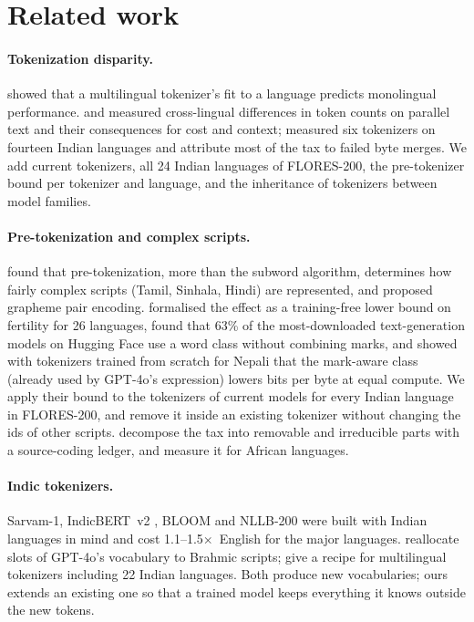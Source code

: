 \documentclass[11pt]{article}
\newcommand{\x}{$\times$}
\begin{document}
\section{Related work}

\paragraph{Tokenization disparity.} \citet{rust2021tokenizer} showed that a multilingual tokenizer's
fit to a language predicts monolingual performance. \citet{petrov2023unfairness} and
\citet{ahia2023allcost} measured cross-lingual differences in token counts on parallel text and their
consequences for cost and context; \citet{srivastava2026tokenizertax} measured six tokenizers on
fourteen Indian languages and attribute most of the tax to failed byte merges. We add current
tokenizers, all 24 Indian languages of FLORES-200, the pre-tokenizer bound per tokenizer and
language, and the inheritance of tokenizers between model families.

\paragraph{Pre-tokenization and complex scripts.} \citet{velayuthan2025egalitarian} found that
pre-tokenization, more than the subword algorithm, determines how fairly complex scripts (Tamil,
Sinhala, Hindi) are represented, and proposed grapheme pair encoding. \citet{regmi2026vowel}
formalised the effect as a training-free lower bound on fertility for 26 languages, found that 63\%
of the most-downloaded text-generation models on Hugging Face use a word class without combining
marks, and showed with tokenizers trained from scratch for Nepali that the mark-aware class (already
used by GPT-4o's expression) lowers bits per byte at equal compute. We apply their bound to the
tokenizers of current models for every Indian language in FLORES-200, and remove it inside an
existing tokenizer without changing the ids of other scripts. \citet{mandarapu2026ledger} decompose
the tax into removable and irreducible parts with a source-coding ledger, and \citet{somide2026african}
measure it for African languages.

\paragraph{Indic tokenizers.} Sarvam-1, IndicBERT~v2 \citep{doddapaneni2023indicbert}, BLOOM and
NLLB-200 \citep{nllb2022} were built with Indian languages in mind and cost 1.1--1.5\x\ English for
the major languages. \citet{shravan2026brahmic} reallocate slots of GPT-4o's vocabulary to Brahmic
scripts; \citet{rana2025mutant} give a recipe for multilingual tokenizers including 22 Indian
languages. Both produce new vocabularies; ours extends an existing one so that a trained model keeps
everything it knows outside the new tokens.
\end{document}
